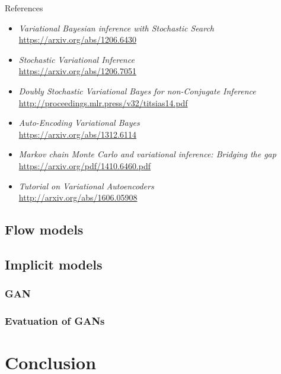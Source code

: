 \begin{frame}{References}
{\scriptsize
\begin{itemize}
    \item \textit{Variational Bayesian inference with Stochastic Search} \\
	\href{https://arxiv.org/abs/1206.6430}{https://arxiv.org/abs/1206.6430}

    \item \textit{Stochastic Variational Inference} \\
	\href{https://arxiv.org/abs/1206.7051}{https://arxiv.org/abs/1206.7051}

    \item \textit{Doubly Stochastic Variational Bayes for non-Conjugate Inference} \\
	\href{http://proceedings.mlr.press/v32/titsias14.pdf}{http://proceedings.mlr.press/v32/titsias14.pdf}

    \item \textit{Auto-Encoding Variational Bayes} \\
	\href{https://arxiv.org/abs/1312.6114}{https://arxiv.org/abs/1312.6114}
    
    \item \textit{Markov chain Monte Carlo and variational inference: Bridging the gap} \\
	\href{https://arxiv.org/pdf/1410.6460.pdf}{https://arxiv.org/pdf/1410.6460.pdf}
	
    \item \textit{Tutorial on Variational Autoencoders} \\
	\href{http://arxiv.org/abs/1606.05908}{http://arxiv.org/abs/1606.05908}
\end{itemize}
}
\end{frame}
\subsection{Flow models}
\subsection{Implicit models}
\subsubsection{GAN}
\subsubsection{Evatuation of GANs}
\section{Conclusion}

 